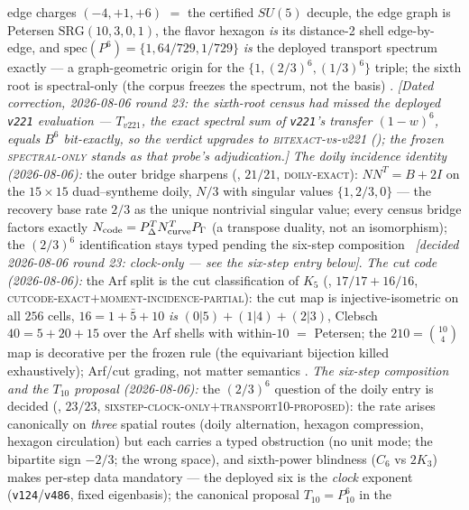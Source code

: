 \documentclass[11pt,a4paper]{article}
\theoremstyle{definition}
\begin{document}
\begin{keybox}
edge charges $(-4,+1,+6)$ $=$ the certified $SU(5)$ decuple, the
edge graph is Petersen $\mathrm{SRG}(10,3,0,1)$, the flavor
hexagon \emph{is} its distance-2 shell edge-by-edge, and
$\mathrm{spec}(P^6)=\{1,64/729,1/729\}$ \emph{is} the deployed
transport spectrum exactly --- a graph-geometric origin for the
$\{1,(2/3)^6,(1/3)^6\}$ triple; the sixth root is spectral-only
(the corpus freezes the spectrum, not the basis) \mE.
\emph{[Dated correction, 2026-08-06 round 23: the sixth-root
census had missed the deployed \texttt{v221} evaluation ---
$T_{v221}$, the exact spectral sum of \texttt{v221}'s transfer
$(1-w)^6$, equals $B^6$ \emph{bit-exactly}, so the verdict
upgrades to \textsc{bitexact}-vs-v221
(); the frozen
\textsc{spectral-only} stands as that probe's adjudication.]}
\emph{The doily incidence identity (2026-08-06):} the outer
bridge sharpens
(, $21/21$,
\textsc{doily-exact}): $NN^{T}=B+2I$ on the $15\times15$
duad--syntheme doily, $N/3$ with singular values $\{1,2/3,0\}$ ---
the recovery base rate $2/3$ as the unique nontrivial singular
value; every census bridge factors exactly
$N_{\rm code}=P_\Delta^{T}N_{\rm curve}^{T}P_\Gamma$ (a transpose
duality, not an isomorphism); the $(2/3)^6$ identification stays
typed pending the six-step composition \mE\ \emph{[decided
2026-08-06 round 23: clock-only --- see the six-step entry
below]}.
\emph{The cut code (2026-08-06):} the Arf split is the cut
classification of $K_5$
(, $17/17+16/16$,
\textsc{cutcode-exact}$+$\textsc{moment-incidence-partial}): the
cut map is injective-isometric on all $256$ cells,
$16=1+\bar5+10$ \emph{is} $(0|5)+(1|4)+(2|3)$, Clebsch
$40=5+20+15$ over the Arf shells with within-$10$ $=$ Petersen;
the $210=\binom{10}{4}$ map is decorative per the frozen rule
(the equivariant bijection killed exhaustively); Arf/cut grading,
not matter semantics \mE.
\emph{The six-step composition and the $T_{10}$ proposal
(2026-08-06):} the $(2/3)^6$ question of the doily entry is
decided
(, $23/23$,
\textsc{sixstep-clock-only}$+$\textsc{transport10-proposed}): the
rate arises canonically on \emph{three} spatial routes (doily
alternation, hexagon compression, hexagon circulation) but each
carries a typed obstruction (no unit mode; the bipartite sign
$-2/3$; the wrong space), and sixth-power blindness ($C_6$ vs
$2K_3$) makes per-step data mandatory --- the deployed six is the
\emph{clock} exponent (\texttt{v124}/\texttt{v486}, fixed
eigenbasis); the canonical proposal $T_{10}=P_{10}^6$ in the

\end{keybox}
\end{document}
